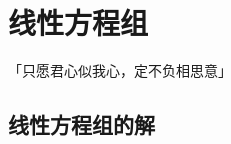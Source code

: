 \chapter{线性方程组}
\begin{center}
	「只愿君心似我心，定不负相思意」
\end{center}
\vspace{-5pt}
\begin{center}
\end{center}

\section{线性方程组的解}

